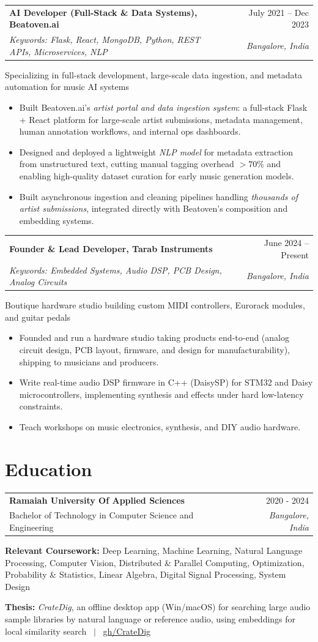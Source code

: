\documentclass[a4paper,margin=0.5in,10pt]{article}
\makeatletter
\newenvironment{joblong}[5] %
    {
    \begin{tabularx}{\linewidth}{@{}l X r@{}}
        \textbf{#1} & \hfill &  #2 \\[3.75pt]
        \small{\textit{#3}} & \hfill & \textit{#4} \\[3.75pt]    
    \end{tabularx}
    \begin{minipage}[t]{\linewidth}
    {#5}
    \begin{itemize}[nosep,after=\strut, leftmargin=2em, itemsep=3pt]
    }
    {
    \end{itemize}
    \end{minipage}    
    }
\newenvironment{degree}[4] %
    {
    \begin{tabularx}{\linewidth}{@{}l X r@{}}
        \textbf{#1} & \hfill &  #3 \\[3.75pt]
        {#2} & \hfill & \textit{#4} \\[3.75pt]    
    \end{tabularx}
    }
    {
    }
\makeatother
\begin{document}
\begin{joblong}{AI Developer (Full-Stack \& Data Systems), Beatoven.ai}{July 2021 – Dec 2023}
    {Keywords: Flask, React, MongoDB, Python, REST APIs, Microservices, NLP}{Bangalore, India}
    {Specializing in full-stack development, large-scale data ingestion, and metadata automation for music AI systems}
    \item Built Beatoven.ai's \textit{artist portal and data ingestion system}: a full-stack Flask + React platform for large-scale artist submissions, metadata management, human annotation workflows, and internal ops dashboards.
    \item Designed and deployed a lightweight \textit{NLP model} for metadata extraction from unstructured text, cutting manual tagging overhead \textit{$>70\%$} and enabling high-quality dataset curation for early music generation models.
    \item Built asynchronous ingestion and cleaning pipelines handling \textit{thousands of artist submissions}, integrated directly with Beatoven's composition and embedding systems.
\end{joblong}

\begin{joblong}{Founder \& Lead Developer, Tarab Instruments}{June 2024 – Present}
    {Keywords: Embedded Systems, Audio DSP, PCB Design, Analog Circuits}{Bangalore, India}
    {Boutique hardware studio building custom MIDI controllers, Eurorack modules, and guitar pedals}
    \item Founded and run a hardware studio taking products end-to-end (analog circuit design, PCB layout, firmware, and design for manufacturability), shipping to musicians and producers.
    \item Write real-time audio DSP firmware in C++ (DaisySP) for STM32 and Daisy microcontrollers, implementing synthesis and effects under hard low-latency constraints.
    \item Teach workshops on music electronics, synthesis, and DIY audio hardware.
\end{joblong}

\section{Education}
\begin{degree}{Ramaiah University Of Applied Sciences}
    {Bachelor of Technology in Computer Science and Engineering}{2020 - 2024}{Bangalore, India}
\textbf{Relevant Coursework:} Deep Learning, Machine Learning, Natural Language Processing, Computer Vision, Distributed \& Parallel Computing, Optimization, Probability \& Statistics, Linear Algebra, Digital Signal Processing, System Design

\textbf{Thesis:} \textit{CrateDig}, an offline desktop app (Win/macOS) for searching large audio sample libraries by natural language or reference audio, using embeddings for local similarity search \ $|$ \ \href{https://github.com/basisvectors/CrateDig}{gh/CrateDig}
\end{degree}
\end{document}
